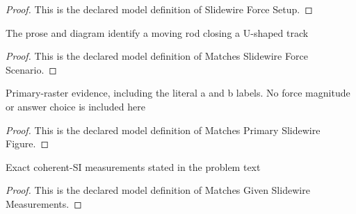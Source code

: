 \begin{proof}
  This is the declared model definition of Slidewire Force Setup.
\end{proof}
\begin{definition}
  \label{def:physics:phyx-mini-0937:phyxminiproblems-problemphyxmini0937-matchesslidewireforcescenario}
  The prose and diagram identify a moving rod closing a U-shaped track
\end{definition}
\begin{proof}
  This is the declared model definition of Matches Slidewire Force Scenario.
\end{proof}
\begin{definition}
  \label{def:physics:phyx-mini-0937:phyxminiproblems-problemphyxmini0937-matchesprimaryslidewirefigure}
  Primary-raster evidence, including the literal a and b labels. No force magnitude or answer choice is included here
\end{definition}
\begin{proof}
  This is the declared model definition of Matches Primary Slidewire Figure.
\end{proof}
\begin{definition}
  \label{def:physics:phyx-mini-0937:phyxminiproblems-problemphyxmini0937-matchesgivenslidewiremeasurements}
  Exact coherent-SI measurements stated in the problem text
\end{definition}
\begin{proof}
  This is the declared model definition of Matches Given Slidewire Measurements.
\end{proof}
